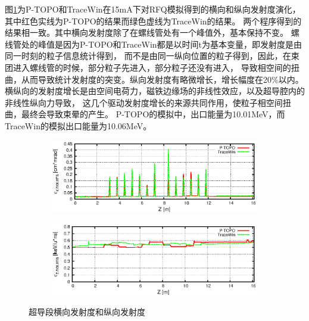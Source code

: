 图\ref{fig:ADS_SC_emit}为P-TOPO和TraceWin在15mA下对RFQ模拟得到的横向和纵向发射度演化，其中红色实线为P-TOPO的结果而绿色虚线为TraceWin的结果。
两个程序得到的结果相一致。其中横向发射度除了在螺线管处有一个峰值外，基本保持不变。
螺线管处的峰值是因为P-TOPO和TraceWin都是以时间t为基本变量，即发射度是由同一时刻的粒子信息统计得到，
而不是由同一纵向位置的粒子得到，因此，在束团进入螺线管的时候，部分粒子先进入，部分粒子还没有进入，
导致相空间的扭曲，从而导致统计发射度的突变。纵向发射度有略微增长，增长幅度在20\%以内。
横纵向的发射度增长是由空间电荷力，磁铁边缘场的非线性效应，以及超导腔内的非线性纵向力导致，
这几个驱动发射度增长的来源共同作用，使粒子相空间扭曲，最终会导致束晕的产生。
P-TOPO的模拟中，出口能量为10.01MeV，而TraceWin的模拟出口能量为10.06MeV。
\begin{figure}[!htb]
    \centering
    \begin{subfigure}[b]{0.9\textwidth}
        \includegraphics[width=\textwidth]{Img/ADS_SC_emit1.eps}
    \end{subfigure}
    \begin{subfigure}[b]{0.9\textwidth}
        \includegraphics[width=\textwidth]{Img/ADS_SC_emit2.eps}
    \end{subfigure}
    \caption{超导段横向发射度和纵向发射度}\label{fig:ADS_SC_emit}
\end{figure}

